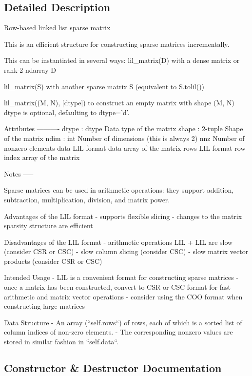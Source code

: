 \subsection{Detailed Description}
\begin{DoxyVerb}Row-based linked list sparse matrix

This is an efficient structure for constructing sparse
matrices incrementally.

This can be instantiated in several ways:
    lil_matrix(D)
        with a dense matrix or rank-2 ndarray D

    lil_matrix(S)
        with another sparse matrix S (equivalent to S.tolil())

    lil_matrix((M, N), [dtype])
        to construct an empty matrix with shape (M, N)
        dtype is optional, defaulting to dtype='d'.

Attributes
----------
dtype : dtype
    Data type of the matrix
shape : 2-tuple
    Shape of the matrix
ndim : int
    Number of dimensions (this is always 2)
nnz
    Number of nonzero elements
data
    LIL format data array of the matrix
rows
    LIL format row index array of the matrix

Notes
-----

Sparse matrices can be used in arithmetic operations: they support
addition, subtraction, multiplication, division, and matrix power.

Advantages of the LIL format
    - supports flexible slicing
    - changes to the matrix sparsity structure are efficient

Disadvantages of the LIL format
    - arithmetic operations LIL + LIL are slow (consider CSR or CSC)
    - slow column slicing (consider CSC)
    - slow matrix vector products (consider CSR or CSC)

Intended Usage
    - LIL is a convenient format for constructing sparse matrices
    - once a matrix has been constructed, convert to CSR or
      CSC format for fast arithmetic and matrix vector operations
    - consider using the COO format when constructing large matrices

Data Structure
    - An array (``self.rows``) of rows, each of which is a sorted
      list of column indices of non-zero elements.
    - The corresponding nonzero values are stored in similar
      fashion in ``self.data``.\end{DoxyVerb}
 

\subsection{Constructor \& Destructor Documentation}
\hypertarget{classscipy_1_1sparse_1_1lil_1_1lil__matrix_afda75424c8e45ae17a4d89704e9834d5}{}
